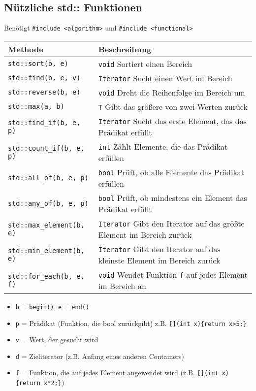 \documentclass[10pt, a3paper, landscape]{article}
\begin{document}
\begin{multicols*}{4}
\section{Nützliche std:: Funktionen}
Benötigt \lstinline|#include <algorithm>| und \lstinline|#include <functional>|
\newline 
\newline 
\noindent
\begin{tabularx}{\linewidth}{l >{\RaggedRight}X}
\toprule
\textbf{Methode} & \textbf{Beschreibung} \\
\midrule
\lstinline|std::sort(b, e)| & \lstinline|void|  Sortiert einen Bereich \\
\lstinline|std::find(b, e, v)| & \lstinline|Iterator|  Sucht einen Wert im Bereich \\
\lstinline|std::reverse(b, e)| & \lstinline|void|  Dreht die Reihenfolge im Bereich um \\
\lstinline|std::max(a, b)| & \lstinline|T|  Gibt das größere von zwei Werten zurück \\
\lstinline|std::find_if(b, e, p)| & \lstinline|Iterator|  Sucht das erste Element, das das Prädikat erfüllt \\
\lstinline|std::count_if(b, e, p)| & \lstinline|int|  Zählt Elemente, die das Prädikat erfüllen \\
\lstinline|std::all_of(b, e, p)| & \lstinline|bool|  Prüft, ob alle Elemente das Prädikat erfüllen \\
\lstinline|std::any_of(b, e, p)| & \lstinline|bool|  Prüft, ob mindestens ein Element das Prädikat erfüllt \\
\lstinline|std::max_element(b, e)| & \lstinline|Iterator|  Gibt den Iterator auf das größte Element im Bereich zurück \\
\lstinline|std::min_element(b, e)| & \lstinline|Iterator|  Gibt den Iterator auf das kleinste Element im Bereich zurück \\
\lstinline|std::for_each(b, e, f)| & \lstinline|void|  Wendet Funktion \lstinline|f| auf jedes Element im Bereich an \\

\bottomrule
\end{tabularx}

\begin{itemize}
    \item \lstinline|b| = \lstinline|begin()|, \lstinline|e| = \lstinline|end()|
    \item \lstinline|p| = Prädikat (Funktion, die bool zurückgibt) z.B. \lstinline|[](int x){return x>5;}|
    \item \lstinline|v| = Wert, der gesucht wird
    \item \lstinline|d| = Zieliterator (z.B. Anfang eines anderen Containers)
    \item \lstinline|f| = Funktion, die auf jedes Element angewendet wird (z.B. \lstinline|[](int x){return x*2;}|)
\end{itemize}


\end{multicols*}
\end{document}
